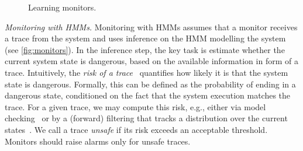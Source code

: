 \documentclass[runningheads]{llncs}
\renewcommand{\paragraph}[1]{\smallskip\noindent\emph{#1}}
\begin{document}
\begin{figure}[t]
\begin{minipage}{.47\textwidth}
{}
        \vspace{-2.5mm}
        \caption{Learning monitors.}
        \label{fig:learning}
    \end{minipage}
\end{figure}




\paragraph{Monitoring with HMMs.} Monitoring with HMMs assumes that a monitor receives a trace from the system and uses inference on the HMM modelling the system (see \cref{fig:monitors}). In the inference step, the key task is estimate whether the current system state is dangerous, based on the available information in form of a trace. Intuitively, the \emph{risk of a trace}~\cite{jungesRuntimeMonitorsMarkov2021} quantifies how likely it is that the system state is dangerous. Formally, this can be defined as the probability of ending in a dangerous state, conditioned on the fact that the system execution matches the trace. For a given trace, we may compute this risk, e.g., either via model checking~\cite{baierComputingConditionalProbabilities2014} or by a (forward) filtering that tracks a distribution over the current states~\cite{xx}. We call a trace \emph{unsafe} if its risk exceeds an acceptable threshold. Monitors should raise alarms only for unsafe traces.
\end{document}
